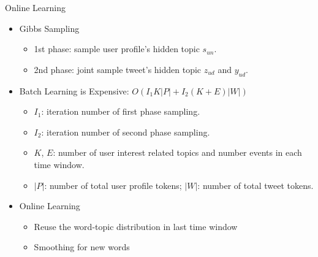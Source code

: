 \documentclass{beamer}
\begin{document}
\begin{frame}
\begin{columns}[T]
\begin{column}{.46\textwidth}
{\begin{block}{Online Learning}
\begin{itemize}
\item Gibbs Sampling
	\begin{itemize}
	\item 1st phase: sample user profile's hidden topic \(s_{un}\).
	\item 2nd phase: joint sample tweet's hidden topic \(z_{ud}\) and \(y_{ud}\).
	\end{itemize}
\item Batch Learning is Expensive: \(O(I_1 K|P|+I_2 (K+E)|W|)\)
	\begin{itemize}
	\item \scriptsize{\(I_1\): iteration number of first phase sampling.}
	\item \scriptsize{\(I_2\): iteration number of second phase sampling.}
	\item \scriptsize{\(K\), \(E\): number of user interest related topics and number events in each time window.}
	\item \scriptsize{\(|P|\):  number of total user profile tokens; \(|W|\): number of total tweet tokens.}
	\end{itemize}
\item Online Learning
\begin{itemize}
\item Reuse the word-topic distribution in last time window
\item Smoothing for new words 
\begin{figure}[H]
        \centering
        \label{fig:subfig} %
\end{figure}
\end{itemize}
\end{itemize}
\end{block}}
\end{column}
\end{columns}
\end{frame}
\end{document}
